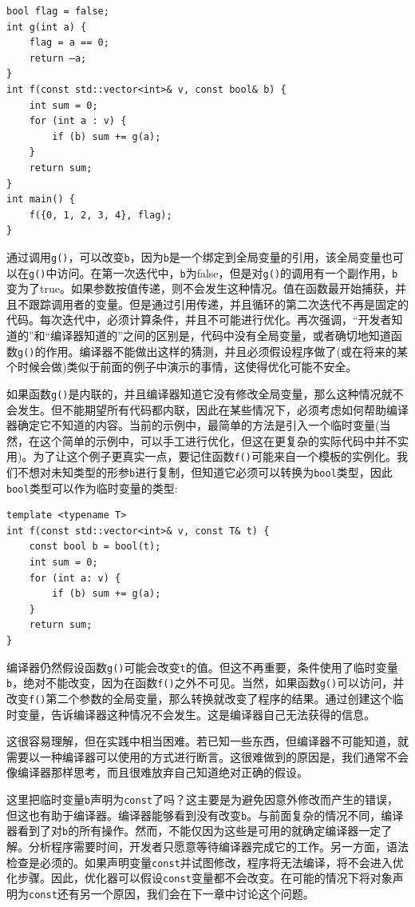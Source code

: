 \begin{lstlisting}[style=styleCXX]
bool flag = false;
int g(int a) {
	flag = a == 0;
	return –a;
}
int f(const std::vector<int>& v, const bool& b) {
	int sum = 0;
	for (int a : v) {
		if (b) sum += g(a);
	}
	return sum;
} 
int main() {
	f({0, 1, 2, 3, 4}, flag);
}
\end{lstlisting}

通过调用\texttt{g()}，可以改变\texttt{b}，因为\texttt{b}是一个绑定到全局变量的引用，该全局变量也可以在\texttt{g()}中访问。在第一次迭代中，\texttt{b}为false，但是对\texttt{g()}的调用有一个副作用，\texttt{b}变为了true。如果参数按值传递，则不会发生这种情况。值在函数最开始捕获，并且不跟踪调用者的变量。但是通过引用传递，并且循环的第二次迭代不再是固定的代码。每次迭代中，必须计算条件，并且不可能进行优化。再次强调，“开发者知道的”和“编译器知道的”之间的区别是，代码中没有全局变量，或者确切地知道函数\texttt{g()}的作用。编译器不能做出这样的猜测，并且必须假设程序做了(或在将来的某个时候会做)类似于前面的例子中演示的事情，这使得优化可能不安全。 

如果函数\texttt{g()}是内联的，并且编译器知道它没有修改全局变量，那么这种情况就不会发生。但不能期望所有代码都内联，因此在某些情况下，必须考虑如何帮助编译器确定它不知道的内容。当前的示例中，最简单的方法是引入一个临时变量(当然，在这个简单的示例中，可以手工进行优化，但这在更复杂的实际代码中并不实用)。为了让这个例子更真实一点，要记住函数\texttt{f()}可能来自一个模板的实例化。我们不想对未知类型的形参\texttt{b}进行复制，但知道它必须可以转换为\texttt{bool}类型，因此\texttt{bool}类型可以作为临时变量的类型:

\begin{lstlisting}[style=styleCXX]
template <typename T>
int f(const std::vector<int>& v, const T& t) {
	const bool b = bool(t);
	int sum = 0;
	for (int a: v) {
		if (b) sum += g(a);
	}
	return sum;
}
\end{lstlisting}

编译器仍然假设函数\texttt{g()}可能会改变\texttt{t}的值。但这不再重要，条件使用了临时变量\texttt{b}，绝对不能改变，因为在函数\texttt{f()}之外不可见。当然，如果函数\texttt{g()}可以访问，并改变\texttt{f()}第二个参数的全局变量，那么转换就改变了程序的结果。通过创建这个临时变量，告诉编译器这种情况不会发生。这是编译器自己无法获得的信息。 

这很容易理解，但在实践中相当困难。若已知一些东西，但编译器不可能知道，就需要以一种编译器可以使用的方式进行断言。这很难做到的原因是，我们通常不会像编译器那样思考，而且很难放弃自己知道绝对正确的假设。 

这里把临时变量\texttt{b}声明为\texttt{const}了吗？这主要是为避免因意外修改而产生的错误，但这也有助于编译器。编译器能够看到没有改变\texttt{b}。与前面复杂的情况不同，编译器看到了对\texttt{b}的所有操作。然而，不能仅因为这些是可用的就确定编译器一定了解。分析程序需要时间，开发者只愿意等待编译器完成它的工作。另一方面，语法检查是必须的。如果声明变量\texttt{const}并试图修改，程序将无法编译，将不会进入优化步骤。因此，优化器可以假设\texttt{const}变量都不会改变。在可能的情况下将对象声明为\texttt{const}还有另一个原因，我们会在下一章中讨论这个问题。 

